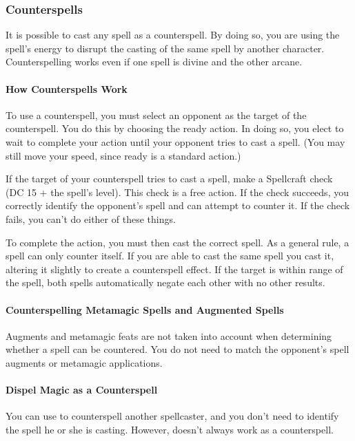 \subsubsection{Counterspells}
\label{sec:Counterspells}
It is possible to cast any spell as a counterspell. 
By doing so, you are using the spell's energy to disrupt the casting of the same spell by another character. 
Counterspelling works even if one spell is divine and the other arcane.

\paragraph{How Counterspells Work}
To use a counterspell, you must select an opponent as the target of the counterspell. 
You do this by choosing the ready action. 
In doing so, you elect to wait to complete your action until your opponent tries to cast a spell. 
(You may still move your speed, since ready is a standard action.)

If the target of your counterspell tries to cast a spell, make a Spellcraft check (DC 15 + the spell's level). 
This check is a free action. 
If the check succeeds, you correctly identify the opponent's spell and can attempt to counter it. 
If the check fails, you can't do either of these things.

To complete the action, you must then cast the correct spell.
As a general rule, a spell can only counter itself. 
If you are able to cast the same spell you cast it, altering it slightly to create a counterspell effect. 
If the target is within range of the spell, both spells automatically negate each other with no other results.

\paragraph{Counterspelling Metamagic Spells and Augmented Spells}
Augments and metamagic feats are not taken into account when determining whether a spell can be countered.
You do not need to match the opponent's spell augments or metamagic applications.

\paragraph{Dispel Magic as a Counterspell}
You can use  to counterspell another spellcaster, and you don't need to identify the spell he or she is casting. 
However,  doesn't always work as a counterspell.

